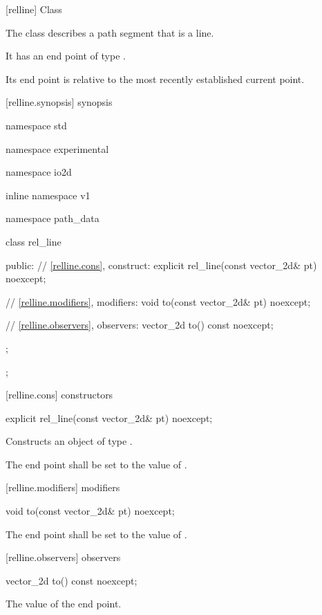  [relline] {Class }

\pnum
{}
The class  describes a path segment that is a line.

\pnum
It has an end point of type .

\pnum
Its end point is relative to the most recently established current point.

 [relline.synopsis] { synopsis}

\begin{codeblock}
namespace std { namespace experimental { namespace io2d { inline namespace v1 {
  namespace path_data {
    class rel_line {
    public:
      // \ref{relline.cons}, construct:
      explicit rel_line(const vector_2d& pt) noexcept;

      // \ref{relline.modifiers}, modifiers:
      void to(const vector_2d& pt) noexcept;

      // \ref{relline.observers}, observers:
      vector_2d to() const noexcept;
    };
  };
} } } }
\end{codeblock}

 [relline.cons] { constructors}

\begin{itemdecl}
    explicit rel_line(const vector_2d& pt) noexcept;
\end{itemdecl}
\begin{itemdescr}
	\pnum
	\effects
	Constructs an object of type .
	
	\pnum
	The end point shall be set to the value of .
\end{itemdescr}

 [relline.modifiers]{ modifiers}

\begin{itemdecl}
    void to(const vector_2d& pt) noexcept;
\end{itemdecl}
\begin{itemdescr}
	\pnum
	\effects
	The end point shall be set to the value of .
\end{itemdescr}

 [relline.observers]{ observers}

\begin{itemdecl}
    vector_2d to() const noexcept;
\end{itemdecl}
\begin{itemdescr}
	\pnum
	\returns
	The value of the end point.
\end{itemdescr}
